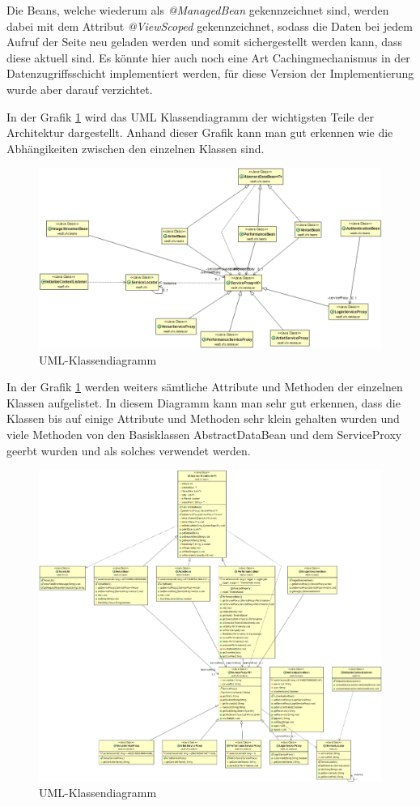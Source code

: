 \documentclass[a4paper,ngerman]{scrartcl}
\begin{document}
Die Beans, welche wiederum als \textit{@ManagedBean} gekennzeichnet sind, werden dabei mit dem Attribut \textit{@ViewScoped} gekennzeichnet, sodass die Daten bei jedem Aufruf der Seite neu geladen werden und somit sichergestellt werden kann, dass diese aktuell sind. Es könnte hier auch noch eine Art Cachingmechanismus in der Datenzugriffsschicht implementiert werden, für diese Version der Implementierung wurde aber darauf verzichtet. 

In der Grafik \ref{fig:uml} wird das UML Klassendiagramm der wichtigsten Teile der Architektur dargestellt. Anhand dieser Grafik kann man gut erkennen wie die Abhängikeiten zwischen den einzelnen Klassen sind. 

\begin{figure}
\centering
\includegraphics[width=.85\textwidth, angle=90]{class_diagrams/architecture_dependencies}
\caption{UML-Klassendiagramm}
\label{fig:uml}
\end{figure}

In der Grafik \ref{fig:uml} werden weiters sämtliche Attribute und Methoden der einzelnen Klassen aufgelistet. In diesem Diagramm kann man sehr gut erkennen, dass die Klassen bis auf einige Attribute und Methoden sehr klein gehalten wurden und viele Methoden von den Basisklassen AbstractDataBean und dem ServiceProxy geerbt wurden und als solches verwendet werden.

\begin{figure}
\centering
\includegraphics[width=.95\textwidth, angle=90]{class_diagrams/architecture}
\caption{UML-Klassendiagramm}
\label{fig:uml2}
\end{figure}
\end{document}
